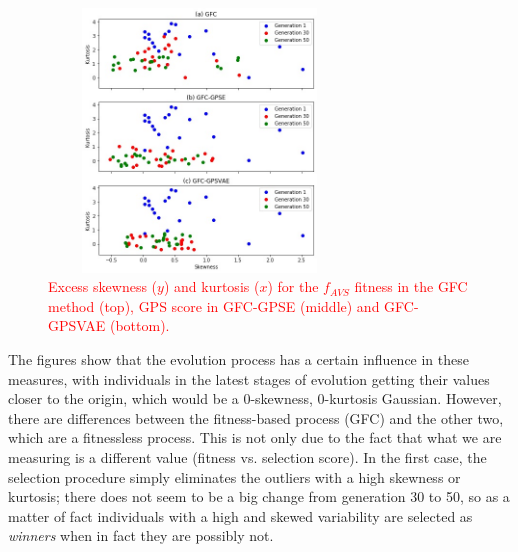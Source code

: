\documentclass[10pt,journal,compsoc]{IEEEtran}
\begin{document}
\begin{figure}[ht]	
	\begin{center}
		\includegraphics[width=8cm, height=7cm]{fig/skew1.jpg}
		\caption{\textcolor{red}{Excess skewness ($y$) and kurtosis ($x$)
			for the $f_{AVS}$ fitness in the  {\sf GFC} method \cite{salem_cig2018} (top), GPS score in {\sf GFC-GPSE} (middle) and {\sf GFC-GPSVAE} (bottom).}}
		\label{fig:gfcsk}
	\end{center}	
\end{figure}
The figures show that the evolution process has a certain influence in
these measures, with individuals in the latest stages of evolution
getting their values closer to the origin, which would be a 0-skewness, 0-kurtosis
Gaussian. However, there are differences between the fitness-based
process ({\sf GFC}) and the other two, which are a fitnessless process. This is not only due to the fact that what we are measuring is a different value (fitness vs. selection score). 
In the first case, the
selection procedure simply eliminates the outliers with a high
skewness or kurtosis; there does not seem to be a big change from
generation 30 to 50, so as a matter of fact individuals with a high
and skewed variability are selected as {\em winners} when in fact they
are possibly not.
\end{document}
